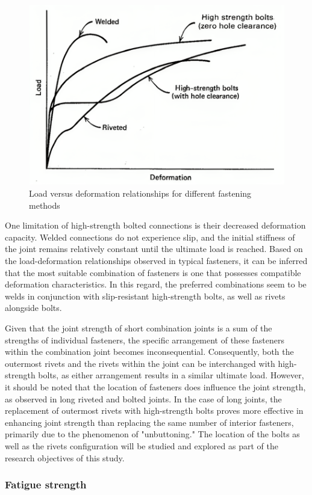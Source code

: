 \begin{figure}[htbp]
    \centering
    \includegraphics[width=0.65\linewidth]{imgs//ch2/hsbrive-1969.png}
    \caption{Load versus deformation relationships for different fastening methods \cite{steinhardt1969-hybrid}}
    \label{fig-hsbriv-stei}
\end{figure}


One limitation of high-strength bolted connections is their decreased deformation capacity. Welded connections do not experience slip, and the initial stiffness of the joint remains relatively constant until the ultimate load is reached. Based on the load-deformation relationships observed in typical fasteners, it can be inferred that the most suitable combination of fasteners is one that possesses compatible deformation characteristics. In this regard, the preferred combinations seem to be welds in conjunction with slip-resistant high-strength bolts, as well as rivets alongside bolts.

Given that the joint strength of short combination joints is a sum of the strengths of individual fasteners, the specific arrangement of these fasteners within the combination joint becomes inconsequential. Consequently, both the outermost rivets and the rivets within the joint can be interchanged with high-strength bolts, as either arrangement results in a similar ultimate load. However, it should be noted that the location of fasteners does influence the joint strength, as observed in long riveted and bolted joints. In the case of long joints, the replacement of outermost rivets with high-strength bolts proves more effective in enhancing joint strength than replacing the same number of interior fasteners, primarily due to the phenomenon of "unbuttoning." The location of the bolts as well as the rivets configuration will be studied and explored as part of the research objectives of this study.

\subsubsection{Fatigue strength}

